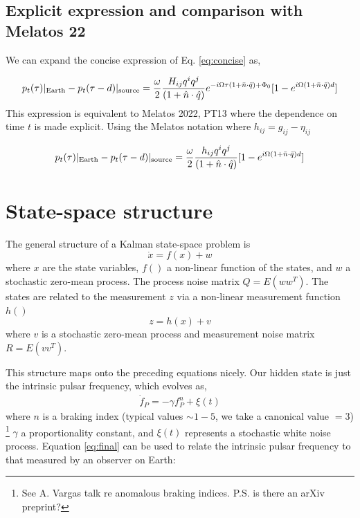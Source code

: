 \documentclass{tufte-handout} %
\begin{document}
\subsection{Explicit expression and comparison with Melatos 22}

We can expand the concise expression of Eq. \ref{eq:concise} as,

\begin{equation} \label{eq:final}
p_t(\tau)|_{\rm Earth} - p_t(\tau - d)|_{\rm source} =\frac{ \omega}{2} \frac{H_{ij}q^i q^j  }{(1 + \hat{n} \cdot \hat{q})}e^{-i \Omega \tau(1+\bar{n} \cdot \bar{q}) + \Phi_0} [1 - e^{i \Omega(1+\bar{n} \cdot \bar{q}) d}]
\end{equation}
This expression is equivalent to Melatos 2022, PT13 where the dependence on time $t$ is made explicit. Using the Melatos notation where $h_{ij} = g_{ij} - \eta_{ij}$


\begin{equation}
	p_t(\tau)|_{\rm Earth} - p_t(\tau - d)|_{\rm source} =\frac{ \omega}{2} \frac{h_{ij} q^i q^j  }{(1 + \hat{n} \cdot \hat{q})} [1 - e^{i \Omega(1+\bar{n} \cdot \bar{q}) d}]
\end{equation}

\newpage
\section{State-space structure} \label{sec3}
\noindent The general structure of a Kalman state-space problem is
\begin{equation}
	\dot{x} = f(x) + w
\end{equation}
where $x$ are the state variables, $f()$ a non-linear function of the states, and $w$ a stochastic zero-mean process. The process noise matrix $Q = E(w w^T)$. The states are related to the measurement $z$ via a non-linear measurement function $h()$
\begin{equation}
	z = h(x) + v
\end{equation}
where $v$ is a stochastic zero-mean process and measurement noise matrix $R = E(v v^T)$. \newline 


\noindent This structure maps onto the preceding equations nicely. Our hidden state is just the intrinsic pulsar frequency, which evolves as,
\begin{eqnarray}
	\dot{f}_P = -\gamma f_P^n + \xi(t)
\end{eqnarray}
where $n$ is a braking index (typical values $\sim 1-5$, we take a canonical value $=3$) \footnote{See A. Vargas talk re anomalous braking indices. P.S. is there an arXiv preprint?} $\gamma$ a proportionality constant, and $\xi(t)$ represents a stochastic white noise process. Equation \ref{eq:final} can be used to relate the intrinsic pulsar frequency to that measured by an observer on Earth:
\end{document}

